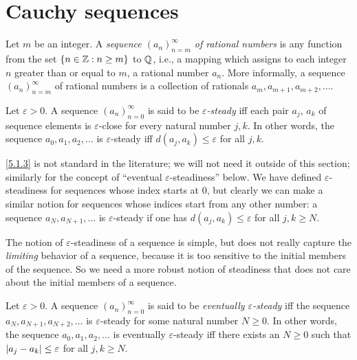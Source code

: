 \section{Cauchy sequences}\label{sec:5.1}

\begin{defn}[Sequences]\label{5.1.1}
  Let \(m\) be an integer.
  A \emph{sequence \((a_n)_{n = m}^{\infty}\) of rational numbers} is any function from the set \(\{n \in \mathbb{Z} : n \geq m\}\) to \(\mathbb{Q}\), i.e., a mapping which assigns to each integer \(n\) greater than or equal to \(m\), a rational number \(a_n\).
  More informally, a sequence \((a_n)_{n = m}^{\infty}\) of rational numbers is a collection of rationals \(a_m, a_{m + 1}, a_{m + 2}, \dots\).
\end{defn}

\setcounter{thm}{2}
\begin{defn}\label{5.1.3}
  Let \(\varepsilon > 0\).
  A sequence \((a_n)_{n = 0}^{\infty}\) is said to be \emph{\(\varepsilon\)-steady} iff each pair \(a_j\), \(a_k\) of sequence elements is \(\varepsilon\)-close for every natural number \(j, k\).
  In other words, the sequence \(a_0, a_1, a_2, \dots\) is \(\varepsilon\)-steady iff \(d(a_j, a_k) \leq \varepsilon\) for all \(j, k\).
\end{defn}

\begin{rmk}\label{5.1.4}
  \cref{5.1.3} is not standard in the literature;
  we will not need it outside of this section;
  similarly for the concept of ``eventual \(\varepsilon\)-steadiness'' below.
  We have defined \(\varepsilon\)-steadiness for sequences whose index starts at \(0\), but clearly we can make a similar notion for sequences whose indices start from any other number:
  a sequence \(a_N, a_{N + 1}, \dots\) is \(\varepsilon\)-steady if one has \(d(a_j, a_k) \leq \varepsilon\) for all \(j, k \geq N\).
\end{rmk}

\begin{note}
  The notion of \(\varepsilon\)-steadiness of a sequence is simple, but does not really capture the \emph{limiting} behavior of a sequence, because it is too sensitive to the initial members of the sequence.
  So we need a more robust notion of steadiness that does not care about the initial members of a sequence.
\end{note}

\setcounter{thm}{5}
\begin{defn}\label{5.1.6}
  Let \(\varepsilon > 0\).
  A sequence \((a_n)_{n = 0}^{\infty}\) is said to be \emph{eventually \(\varepsilon\)-steady} iff the sequence \(a_N, a_{N + 1}, a_{N + 2}, \dots\) is \(\varepsilon\)-steady for some natural number \(N \geq 0\).
  In other words, the sequence \(a_0, a_1, a_2, \dots\) is eventually \(\varepsilon\)-steady iff there exists an \(N \geq 0\) such that \(\left\lvert a_j - a_k\right\rvert \leq \varepsilon\) for all \(j, k \geq N\).
\end{defn}

